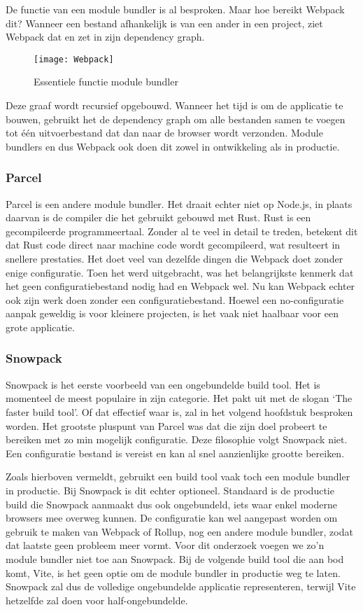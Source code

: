 De functie van een module bundler is al besproken. Maar hoe bereikt Webpack dit? Wanneer een bestand afhankelijk is van een ander in een project, ziet Webpack dat en zet in zijn dependency graph.

\begin{figure}[h]
\texttt{[image: Webpack]}
   \caption{Essentiele functie module bundler \autocite{webpack-no-date}}
\end{figure}

Deze graaf wordt recursief opgebouwd. Wanneer het tijd is om de applicatie te bouwen, gebruikt het de dependency graph om alle bestanden samen te voegen tot één uitvoerbestand dat dan naar de browser wordt verzonden. Module bundlers en dus Webpack ook doen dit zowel in ontwikkeling als in productie.

\subsubsection{Parcel}

Parcel is een andere module bundler. Het draait echter niet op Node.js, in plaats daarvan is de compiler die het gebruikt gebouwd met Rust. Rust is een gecompileerde programmeertaal. Zonder al te veel in detail te treden, betekent dit dat Rust code direct naar machine code wordt gecompileerd, wat resulteert in snellere prestaties. Het doet veel van dezelfde dingen die Webpack doet zonder enige configuratie. Toen het werd uitgebracht, was het belangrijkste kenmerk dat het geen configuratiebestand nodig had en Webpack wel. Nu kan Webpack echter ook zijn werk doen zonder een configuratiebestand. Hoewel een no-configuratie aanpak geweldig is voor kleinere projecten, is het vaak niet haalbaar voor een grote applicatie. 

\subsubsection{Snowpack}

Snowpack is het eerste voorbeeld van een ongebundelde build tool. Het is momenteel de meest populaire in zijn categorie. Het pakt uit met de slogan ‘The faster build tool’. Of dat effectief waar is, zal in het volgend hoofdstuk besproken worden. Het grootste pluspunt van Parcel was dat die zijn doel probeert te bereiken met zo min mogelijk configuratie. Deze filosophie volgt Snowpack niet. Een configuratie bestand is vereist en kan al snel aanzienlijke grootte bereiken.

Zoals hierboven vermeldt, gebruikt een build tool vaak toch een module bundler in productie. Bij Snowpack is dit echter optioneel. Standaard is de productie build die Snowpack aanmaakt dus ook ongebundeld, iets waar enkel moderne browsers mee overweg kunnen. De configuratie kan wel aangepast worden om gebruik te maken van Webpack of Rollup, nog een andere module bundler, zodat dat laatste geen probleem meer vormt. Voor dit onderzoek voegen we zo’n module bundler niet toe aan Snowpack. Bij de volgende build tool die aan bod komt, Vite, is het geen optie om de module bundler in productie weg te laten. Snowpack zal dus de volledige ongebundelde applicatie representeren, terwijl Vite hetzelfde zal doen voor half-ongebundelde.

